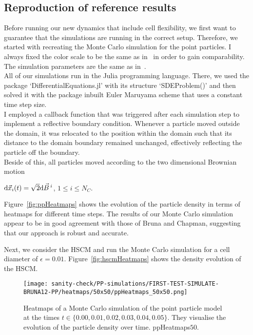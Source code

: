 \subsection{Reproduction of reference results}
Before running our new dynamics that include cell flexibility, we first want to guarantee that the simulations are running in the correct setup.
Therefore, we started with recreating the Monte Carlo simulation for the point particles. 
I always fixed the color scale to be the same as in~\cite{Bruna2012} in order to gain comparability. 
The simulation parameters are the same as in~\cite{Bruna2012}. \\
All of our simulations run in the Julia programming language. 
There, we used the package `DifferentialEquations.jl' with its structure `SDEProblem()' and then solved it with the package inbuilt Euler Maruyama scheme that uses a constant time step size. \\
I employed a callback function that was triggered after each simulation step to implement a reflective boundary condition. 
Whenever a particle moved outside the domain, it was relocated to the position within the domain such that its distance to the domain boundary remained unchanged, effectively reflecting the particle off the boundary. \\
Beside of this, all particles moved according to the two dimensional Brownian motion
\begin{center}
		$ \mathrm{d} \vec{x}_i(t) = \sqrt{2} \mathrm{d} \vec{B}^{\:i}$, \hspace{0.5em} $1 \leq i \leq N_{C}$.
\end{center}
Figure~\ref{fig:ppHeatmaps} shows the evolution of the particle density in terms of heatmaps for different time steps. 
The results of our Monte Carlo simulation appear to be in good agreement with those of Bruna and Chapman, suggesting that our approach is robust and accurate.

Next, we consider the HSCM and run the Monte Carlo simulation for a cell diameter of $\epsilon = 0.01$. 
Figure~\ref{fig:hscmHeatmaps} shows the density evolution of the HSCM.

\begin{figure}[h]
	\centering
    \texttt{[image: sanity-check/PP-simulations/FIRST-TEST-SIMULATE-BRUNA12-PP/heatmaps/50x50/ppHeatmaps\_50x50.png]}
    \caption{Heatmaps of a Monte Carlo simulation of the point particle model at the times $t \in \{0.00, 0.01, 0.02, 0.03, 0.04, 0.05\}$. 
    They visualise the evolution of the particle density over time. 
    ppHeatmaps$50$. 
    }
\end{figure}

